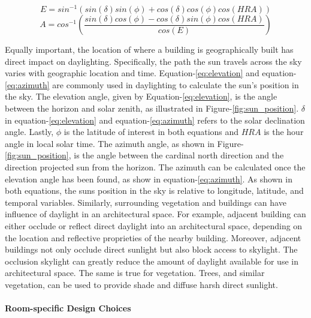     \begin{equation} \label{eq:elevation}
    E = sin^{-1}(sin(\delta) sin(\phi) + cos(\delta) cos(\phi) cos(HRA))
    \end{equation}
    \begin{equation} \label{eq:azimuth}
    A = cos^{-1}( \frac{sin(\delta) cos(\phi) - cos(\delta) sin(\phi) cos(HRA)}{cos(E)})
    \end{equation}

    Equally important, the location of where a building is geographically built has direct impact on daylighting.
    Specifically, the path the sun travels across the sky varies with geographic location and time. 
    Equation-\ref{eq:elevation} and equation-\ref{eq:azimuth} are commonly used in daylighting to calculate the sun's position in the sky. 
    The elevation angle, given by Equation-\ref{eq:elevation}, is the angle between the horizon and solar zenith, as illustrated in Figure-\ref{fig:sun_position}. 
    $\delta$ in  equation-\ref{eq:elevation} and equation-\ref{eq:azimuth} refers to the solar declination angle. 
    Lastly, $\phi$ is the latitude of interest in both equations and $HRA$ is the hour angle in local solar time.
    The azimuth angle, as shown in Figure-\ref{fig:sun_position}, is the angle between the cardinal north direction and the direction projected sun from the horizon. The azimuth can be calculated once the elevation angle has been found, as show in equation-\ref{eq:azimuth}.
    As shown in both equations, the suns position in the sky is relative to longitude, latitude, and temporal variables.
    Similarly, surrounding vegetation and buildings can have influence of daylight in an architectural space. 
    For example, adjacent building can either occlude or reflect direct daylight into an architectural space, depending on the location and reflective proprieties of the nearby building. 
    Moreover, adjacent buildings not only occlude direct sunlight but also block access to skylight.
    The occlusion skylight can greatly reduce the amount of daylight available for use in architectural space.
    The same is true for vegetation. Trees, and similar vegetation, can be used to provide shade and diffuse harsh direct sunlight.
    \\

    \paragraph{Room-specific Design Choices} 


